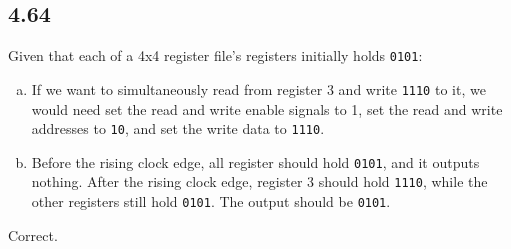 \documentclass{article}
\begin{document}
\subsection*{4.64}
Given that each of a 4x4 register file's registers initially holds \texttt{0101}:
\begin{enumerate}[(a)]
    \item If we want to simultaneously read from register 3 and write \texttt{1110} to it, we would need set the read and write enable signals to 1, set the read and write addresses to \texttt{10}, and set the write data to \texttt{1110}.
    \item Before the rising clock edge, all register should hold \texttt{0101}, and it outputs nothing. After the rising clock edge, register 3 should hold \texttt{1110}, while the other registers still hold \texttt{0101}. The output should be \texttt{0101}.
\end{enumerate}

\textcolor{mygreen}{Correct.}
\end{document}
